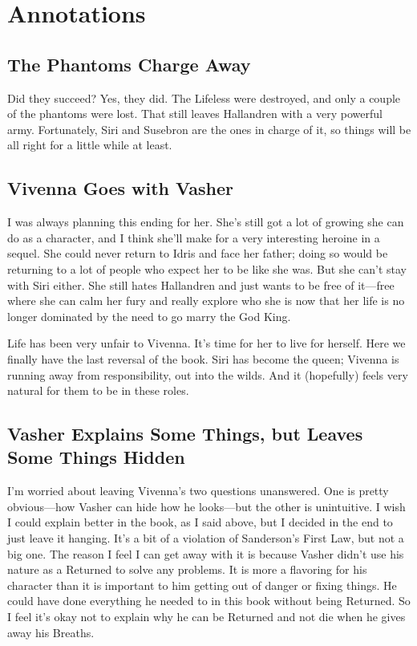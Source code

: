 \section*{Annotations}

\subsection*{The Phantoms Charge Away}

Did they succeed? Yes, they did. The Lifeless were destroyed, and only a couple of the phantoms were lost. That still leaves Hallandren with a very powerful army. Fortunately, Siri and Susebron are the ones in charge of it, so things will be all right for a little while at least.

\subsection*{Vivenna Goes with Vasher}

I was always planning this ending for her. She’s still got a lot of growing she can do as a character, and I think she’ll make for a very interesting heroine in a sequel. She could never return to Idris and face her father; doing so would be returning to a lot of people who expect her to be like she was. But she can’t stay with Siri either. She still hates Hallandren and just wants to be free of it—free where she can calm her fury and really explore who she is now that her life is no longer dominated by the need to go marry the God King.

Life has been very unfair to Vivenna. It’s time for her to live for herself. Here we finally have the last reversal of the book. Siri has become the queen; Vivenna is running away from responsibility, out into the wilds. And it (hopefully) feels very natural for them to be in these roles.

\subsection*{Vasher Explains Some Things, but Leaves Some Things Hidden}

I’m worried about leaving Vivenna’s two questions unanswered. One is pretty obvious—how Vasher can hide how he looks—but the other is unintuitive. I wish I could explain better in the book, as I said above, but I decided in the end to just leave it hanging. It’s a bit of a violation of Sanderson’s First Law, but not a big one. The reason I feel I can get away with it is because Vasher didn’t use his nature as a Returned to solve any problems. It is more a flavoring for his character than it is important to him getting out of danger or fixing things. He could have done everything he needed to in this book without being Returned. So I feel it’s okay not to explain why he can be Returned and not die when he gives away his Breaths.

